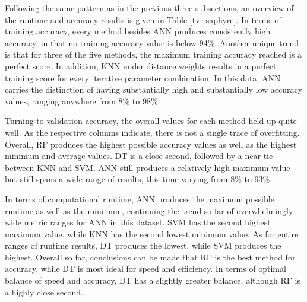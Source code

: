 \documentclass[12pt]{uthesis-v12}  %
\begin{document}
Following the same pattern as in the previous three subsections, an overview of the runtime and accuracy results is given in Table \ref{tvr-saphyre}. In terms of training accuracy, every method besides ANN produces consistently high accuracy, in that no training accuracy value is below 94\%. Another unique trend is that for three of the five methods, the maximum training accuracy reached is a perfect score. In addition, KNN under distance weights results in a perfect training score for every iterative parameter combination. In this data, ANN carries the distinction of having substantially high and substantially low accuracy values, ranging anywhere from 8\% to 98\%.

Turning to validation accuracy, the overall values for each method held up quite well. As the respective columns indicate, there is not a single trace of overfitting. Overall, RF produces the highest possible accuracy values as well as the highest minimum and average values. DT is a close second, followed by a near tie between KNN and SVM. ANN still produces a relatively high maximum value but still spans a wide range of results, this time varying from 8\% to 93\%. 

In terms of computational runtime, ANN produces the maximum possible runtime as well as the minimum, continuing the trend so far of overwhelmingly wide metric ranges for ANN in this dataset. SVM has the second highest maximum value, while KNN has the second lowest minimum value. As for entire ranges of runtime results, DT produces the lowest, while SVM produces the highest. Overall so far, conclusions can be made that RF is the best method for accuracy, while DT is most ideal for speed and efficiency. In terms of optimal balance of speed and accuracy, DT has a slightly greater balance, although RF is a highly close second.
\end{document}

